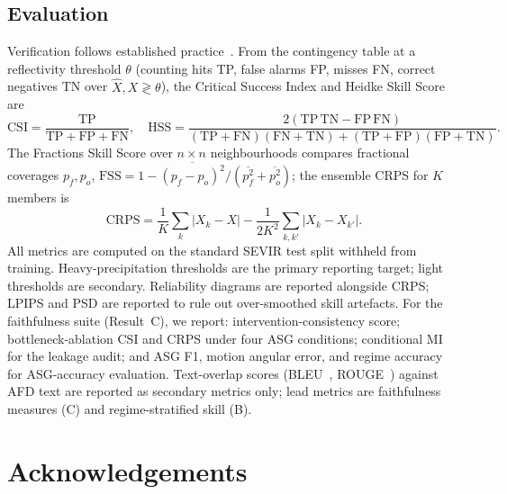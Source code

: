 \documentclass[fleqn,10pt]{wlscirep}
\begin{document}
\subsection*{Evaluation}

Verification follows established practice~\cite{jolliffe2012forecast}.
From the contingency table at a reflectivity threshold $\theta$ (counting hits TP, false alarms FP, misses FN, correct negatives TN over $\hat{X},X \gtrless \theta$), the Critical Success Index and Heidke Skill Score are
\begin{equation}
\mathrm{CSI}=\frac{\mathrm{TP}}{\mathrm{TP}+\mathrm{FP}+\mathrm{FN}},\quad
\mathrm{HSS}=\frac{2(\mathrm{TP}\,\mathrm{TN}-\mathrm{FP}\,\mathrm{FN})}{(\mathrm{TP}{+}\mathrm{FN})(\mathrm{FN}{+}\mathrm{TN})+(\mathrm{TP}{+}\mathrm{FP})(\mathrm{FP}{+}\mathrm{TN})}.
\label{eq:csi}
\end{equation}
The Fractions Skill Score over $n{\times}n$ neighbourhoods compares fractional coverages $p_f,p_o$, $\mathrm{FSS}=1-\overline{(p_f-p_o)^2}/(\overline{p_f^2}+\overline{p_o^2})$; the ensemble CRPS for $K$ members is
\begin{equation}
\mathrm{CRPS}=\frac{1}{K}\sum_{k}|X_k-X| - \frac{1}{2K^2}\sum_{k,k'}|X_k-X_{k'}|.
\label{eq:crps}
\end{equation}
All metrics are computed on the standard SEVIR test split withheld from training.
Heavy-precipitation thresholds are the primary reporting target; light thresholds are secondary.
Reliability diagrams are reported alongside CRPS; LPIPS and PSD are reported to rule out over-smoothed skill artefacts.
For the faithfulness suite (Result~C), we report: intervention-consistency score; bottleneck-ablation CSI and CRPS under four ASG conditions; conditional MI for the leakage audit; and ASG F1, motion angular error, and regime accuracy for ASG-accuracy evaluation.
Text-overlap scores (BLEU~\cite{papineni2002bleu}, ROUGE~\cite{lin2004rouge}) against AFD text are reported as secondary metrics only; lead metrics are faithfulness measures (C) and regime-stratified skill (B).

\section*{Acknowledgements}

\end{document}
